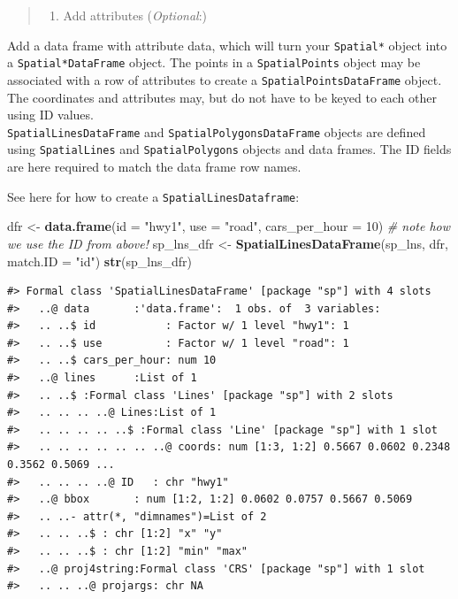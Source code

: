 \documentclass[]{book}
\newenvironment{Shaded}{\begin{snugshade}}{\end{snugshade}}
\newcommand{\KeywordTok}[1]{\textcolor[rgb]{0.13,0.29,0.53}{\textbf{#1}}}
\newcommand{\DataTypeTok}[1]{\textcolor[rgb]{0.13,0.29,0.53}{#1}}
\newcommand{\DecValTok}[1]{\textcolor[rgb]{0.00,0.00,0.81}{#1}}
\newcommand{\StringTok}[1]{\textcolor[rgb]{0.31,0.60,0.02}{#1}}
\newcommand{\CommentTok}[1]{\textcolor[rgb]{0.56,0.35,0.01}{\textit{#1}}}
\newcommand{\NormalTok}[1]{#1}
\providecommand{\tightlist}{%
  \setlength{\itemsep}{0pt}\setlength{\parskip}{0pt}}
\theoremstyle{definition}
\theoremstyle{definition}
\theoremstyle{definition}
\theoremstyle{remark}
\begin{document}
\begin{quote}
\begin{enumerate}
\def\labelenumi{\Roman{enumi}.}
\setcounter{enumi}{2}
\tightlist
\item
  Add attributes (\emph{Optional}:)
\end{enumerate}
\end{quote}

Add a data frame with attribute data, which will turn your
\texttt{Spatial*} object into a \texttt{Spatial*DataFrame} object. The
points in a \texttt{SpatialPoints} object may be associated with a row
of attributes to create a \texttt{SpatialPointsDataFrame} object. The
coordinates and attributes may, but do not have to be keyed to each
other using ID values.\\
\texttt{SpatialLinesDataFrame} and \texttt{SpatialPolygonsDataFrame}
objects are defined using \texttt{SpatialLines} and
\texttt{SpatialPolygons} objects and data frames. The ID fields are here
required to match the data frame row names.

See here for how to create a \texttt{SpatialLinesDataframe}:

\begin{Shaded}
\begin{Highlighting}[]
\NormalTok{dfr <-}\StringTok{ }\KeywordTok{data.frame}\NormalTok{(}\DataTypeTok{id =} \StringTok{"hwy1"}\NormalTok{, }\DataTypeTok{use =} \StringTok{"road"}\NormalTok{, }\DataTypeTok{cars_per_hour =} \DecValTok{10}\NormalTok{) }\CommentTok{# note how we use the ID from above!}
\NormalTok{sp_lns_dfr <-}\StringTok{ }\KeywordTok{SpatialLinesDataFrame}\NormalTok{(sp_lns, dfr, }\DataTypeTok{match.ID =} \StringTok{"id"}\NormalTok{)}
\KeywordTok{str}\NormalTok{(sp_lns_dfr)}
\end{Highlighting}
\end{Shaded}

\begin{verbatim}
#> Formal class 'SpatialLinesDataFrame' [package "sp"] with 4 slots
#>   ..@ data       :'data.frame':  1 obs. of  3 variables:
#>   .. ..$ id           : Factor w/ 1 level "hwy1": 1
#>   .. ..$ use          : Factor w/ 1 level "road": 1
#>   .. ..$ cars_per_hour: num 10
#>   ..@ lines      :List of 1
#>   .. ..$ :Formal class 'Lines' [package "sp"] with 2 slots
#>   .. .. .. ..@ Lines:List of 1
#>   .. .. .. .. ..$ :Formal class 'Line' [package "sp"] with 1 slot
#>   .. .. .. .. .. .. ..@ coords: num [1:3, 1:2] 0.5667 0.0602 0.2348 0.3562 0.5069 ...
#>   .. .. .. ..@ ID   : chr "hwy1"
#>   ..@ bbox       : num [1:2, 1:2] 0.0602 0.0757 0.5667 0.5069
#>   .. ..- attr(*, "dimnames")=List of 2
#>   .. .. ..$ : chr [1:2] "x" "y"
#>   .. .. ..$ : chr [1:2] "min" "max"
#>   ..@ proj4string:Formal class 'CRS' [package "sp"] with 1 slot
#>   .. .. ..@ projargs: chr NA
\end{verbatim}
\end{document}
